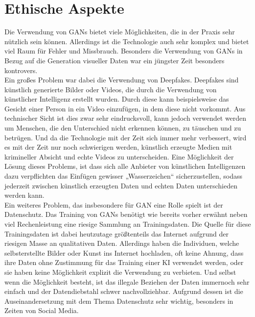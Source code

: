 \section{Ethische Aspekte}

\noindent Die Verwendung von \acp{GAN} bietet viele Möglichkeiten, die in der Praxis sehr nützlich sein können. Allerdings ist die Technologie auch sehr komplex und bietet viel Raum für Fehler und Missbrauch. Besonders die Verwendung von \acp{GAN} in Bezug auf die Generation visueller Daten war ein jüngster Zeit besonders kontrovers. \\

\noindent Ein großes Problem war dabei die Verwendung von Deepfakes. Deepfakes sind künstlich generierte Bilder oder Videos, die durch die Verwendung von künstlicher Intelligenz erstellt wurden. Durch diese kann beispielsweise das Gesicht einer Person in ein Video einzufügen, in dem diese nicht vorkommt. Aus technischer Sicht ist dies zwar sehr eindrucksvoll, kann jedoch verwendet werden um Menschen, die den Unterschied nicht erkennen können, zu täuschen und zu betrügen. Und da die Technologie mit der Zeit sich immer mehr verbessert, wird es mit der Zeit nur noch schwierigen werden, künstlich erzeugte Medien mit krimineller Absicht und echte Videos zu unterscheiden. Eine Möglichkeit der Lösung dieses Problems, ist dass sich alle Anbieter von künstlichen Intelligenzen dazu verpflichten das Einfügen gewisser „Wasserzeichen“ sicherzustellen, sodass jederzeit zwischen künstlich erzeugten Daten und echten Daten unterschieden werden kann.\\

\noindent Ein weiteres Problem, das insbesondere für \ac{GAN} eine Rolle spielt ist der Datenschutz. Das Training von \acp{GAN} benötigt wie bereits vorher erwähnt neben viel Rechenleistung eine riesige Sammlung an Trainingsdaten. Die Quelle für diese Trainingsdaten ist dabei heutzutage größtenteils das Internet aufgrund der riesigen Masse an qualitativen Daten. Allerdings haben die Individuen, welche selbsterstellte Bilder oder Kunst ins Internet hochladen, oft keine Ahnung, dass ihre Daten ohne Zustimmung für das Training einer KI verwendet werden, oder sie haben keine Möglichkeit explizit die Verwendung zu verbieten. Und selbst wenn die Möglichkeit besteht, ist das illegale Beziehen der Daten immernoch sehr einfach und der Datendiebstahl schwer nachvollziehbar. Aufgrund dessen ist die Auseinandersetzung mit dem Thema Datenschutz sehr wichtig, besonders in Zeiten von Social Media. \\

\newpage